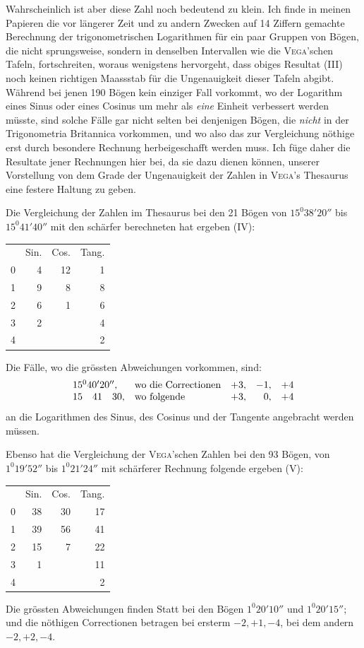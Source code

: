 Wahrscheinlich ist aber diese Zahl noch bedeutend zu klein. Ich finde in
meinen Papieren die vor längerer Zeit und zu andern Zwecken auf 14 Ziffern gemachte Berechnung der trigonometrischen Logarithmen für ein paar Gruppen von
Bögen, die nicht sprungsweise, sondern in denselben Intervallen wie die \textsc{Vega}'schen Tafeln, fortschreiten, woraus wenigstens hervorgeht, dass obiges Resultat
(III) noch keinen richtigen Maassstab für die Ungenauigkeit dieser Tafeln abgibt.
Während bei jenen 190 Bögen kein einziger Fall vorkommt, wo der Logarithm
eines Sinus oder eines Cosinus um mehr als \textit{eine} Einheit verbessert werden müsste,
sind solche Fälle gar nicht selten bei denjenigen Bögen, die \textit{nicht} in der Trigonometria Britannica vorkommen, und wo also das zur Vergleichung nöthige erst
durch besondere Rechnung herbeigeschafft werden muss. Ich füge daher die Resultate jener Rechnungen hier bei, da sie dazu dienen können, unserer Vorstellung von dem Grade der Ungenauigkeit der Zahlen in \textsc{Vega}'s Thesaurus eine festere Haltung zu geben.
\par
{}
Die Vergleichung der Zahlen im Thesaurus bei den 21 Bögen von $15^{0}38'20''$ bis $15^{0}41'40''$ mit den schärfer berechneten hat ergeben (IV):
\begin{center}\begin{tabular}{r r r r}
& Sin. & Cos. & Tang.\\
0&4&12&1\\
1&9&8&8\\
2&6&1&6\\
3&2&&4\\
4&&&2
\end{tabular}\end{center}
Die Fälle, wo die grössten Abweichungen vorkommen, sind:
\[
\begin{array}{l l r r r}
15^{0}40'20'',&\text{wo die Correctionen}&+3,&-1,&+4\\
15\quad41\quad30,&\text{wo folgende}&+3,&0,&+4
\end{array}
\]
an die Logarithmen des Sinus, des Cosinus und der Tangente angebracht werden müssen.

Ebenso hat die Vergleichung der \textsc{Vega}'schen Zahlen bei den 93 Bögen, von $1^{0}19'52''$ bis $1^{0}21'24''$ mit schärferer Rechnung folgende ergeben (V):
\begin{center}\begin{tabular}{r r r r}
& Sin. & Cos. & Tang.\\
0&38&30&17\\
1&39&56&41\\
2&15&7&22\\
3&1&&11\\
4&&&2
\end{tabular}\end{center}
Die grössten Abweichungen finden Statt bei den Bögen $1^{0}20'10''$ und $1^{0}20'15''$; und die nöthigen Correctionen betragen bei ersterm $-2,+1,-4$, bei dem andern $-2,+2,-4$.

